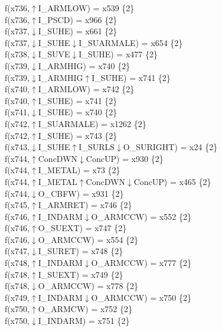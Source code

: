 f(x736,$\uparrow$I\_ARMLOW) = x539 \{2\} \\  
f(x736,$\uparrow$I\_PSCD) = x966 \{2\} \\  
f(x737,$\downarrow$I\_SUHE) = x661 \{2\} \\  
f(x737,$\downarrow$I\_SUHE$\downarrow$I\_SUARMALE) = x654 \{2\} \\  
f(x738,$\downarrow$I\_SUVE$\downarrow$I\_SUHE) = x477 \{2\} \\  
f(x739,$\downarrow$I\_ARMHIG) = x740 \{2\} \\  
f(x739,$\downarrow$I\_ARMHIG$\uparrow$I\_SUHE) = x741 \{2\} \\  
f(x740,$\uparrow$I\_ARMLOW) = x742 \{2\} \\  
f(x740,$\uparrow$I\_SUHE) = x741 \{2\} \\  
f(x741,$\downarrow$I\_SUHE) = x740 \{2\} \\  
f(x742,$\uparrow$I\_SUARMALE) = x1262 \{2\} \\  
f(x742,$\uparrow$I\_SUHE) = x743 \{2\} \\  
f(x743,$\downarrow$I\_SUHE$\uparrow$I\_SURLS$\downarrow$O\_SURIGHT) = x24 \{2\} \\  
f(x744,$\uparrow$ConcDWN$\downarrow$ConcUP) = x930 \{2\} \\  
f(x744,$\uparrow$I\_METAL) = x73 \{2\} \\  
f(x744,$\uparrow$I\_METAL$\uparrow$ConcDWN$\downarrow$ConcUP) = x465 \{2\} \\  
f(x744,$\downarrow$O\_CBFW) = x931 \{2\} \\  
f(x745,$\uparrow$I\_ARMRET) = x746 \{2\} \\  
f(x746,$\uparrow$I\_INDARM$\downarrow$O\_ARMCCW) = x552 \{2\} \\  
f(x746,$\uparrow$O\_SUEXT) = x747 \{2\} \\  
f(x746,$\downarrow$O\_ARMCCW) = x554 \{2\} \\  
f(x747,$\downarrow$I\_SURET) = x748 \{2\} \\  
f(x748,$\uparrow$I\_INDARM$\downarrow$O\_ARMCCW) = x777 \{2\} \\  
f(x748,$\uparrow$I\_SUEXT) = x749 \{2\} \\  
f(x748,$\downarrow$O\_ARMCCW) = x778 \{2\} \\  
f(x749,$\uparrow$I\_INDARM$\downarrow$O\_ARMCCW) = x750 \{2\} \\  
f(x750,$\uparrow$O\_ARMCW) = x752 \{2\} \\  
f(x750,$\downarrow$I\_INDARM) = x751 \{2\} \\  
